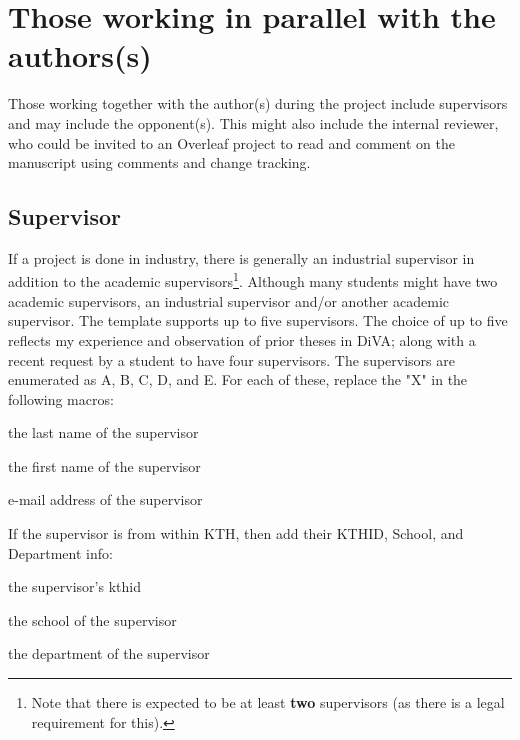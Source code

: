 \documentclass[12pt, twoside]{article}
\begin{document}
\section[Those working in parallel with the authors(s)]{Those working in parallel with the authors(s)}
\label{sec:examinerAdvisorsOpponent}
Those working together with the author(s) during the project include supervisors and may include the opponent(s). This might also include the internal reviewer, who could be invited to an Overleaf project to read and comment on the manuscript using comments and change tracking.

\subsection{Supervisor}
\label{sec:supervisorMacros}
If a project is done in industry, there is generally an industrial supervisor in addition to the academic supervisors\footnote{Note that there is expected to be at least \textbf{two} supervisors (as there is a legal requirement for this).}. Although many students might have two academic supervisors, an industrial supervisor and/or another academic supervisor. The template supports up to five supervisors. The choice of up to five reflects my experience and observation of prior theses in \gls{DiVA}; along with a recent request by a student to have four supervisors. The supervisors are enumerated as A, B, C, D, and E. For each of these, replace the "X" in the following macros:
\begin{description}[leftmargin=!, labelwidth =\widthof{\texttt{\textbackslash secondAuthorsFirstname\{\}}}]
\item [\texttt{\textbackslash supervisorXsLastname\{\}}] the last name of the supervisor
\item [\texttt{\textbackslash supervisorXsFirstname\{\}}] the first name of the supervisor
\item [\texttt{\textbackslash supervisorXsEmail\{\}}] e-mail address of the supervisor
\end{description}

If the supervisor is from within \gls{KTH}, then add their KTHID, School, and Department info:
\begin{description}[leftmargin=!, labelwidth =\widthof{\texttt{\textbackslash secondAuthorsFirstname\{\}}}]
\item [\texttt{\textbackslash supervisorXsKTHID\{\}}] the supervisor's kthid 
\item [\texttt{\textbackslash supervisorXsSchool\{\}}] the school of the supervisor
\item [\texttt{\textbackslash supervisorXsDepartment\{\}}] the department of the supervisor
\end{description}
\end{document}
